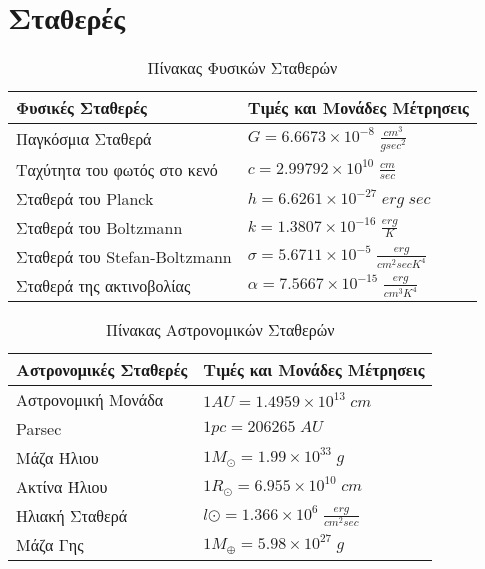 \documentclass[12pt,twoside]{report}
\numberwithin{equation}{section}
\newcommand{\en} {\selectlanguage {english}}
\begin{document}
\newpage

\tableofcontents
\listoffigures
\listoftables


\newpage
\chapter*{Σταθερές}
\begin{table}[h]
 \centering
 \begin{tabular}{l | l }
   Φυσικές Σταθερές & {Τιμές και Μονάδες Μέτρησεις}\\
     \hline \hline
   Παγκόσμια Σταθερά & $G=6.6673\times10^{-8} \; \frac{cm^3}{g sec^2} $\\
   Ταχύτητα του φωτός στο κενό & $c=2.99792\times10^{10} \; \frac{cm}{sec}$\\
   Σταθερά του {\en Planck} & $h=6.6261\times10^{-27} \; erg \; sec$\\
   Σταθερά του {\en Boltzmann} & $k=1.3807\times10^{-16} \; \frac{erg}{K}$\\
   Σταθερά του {\en Stefan-Boltzmann} & $\sigma=5.6711\times10^{-5} \; \frac{erg}{cm^2 sec K^4}$\\
   Σταθερά της ακτινοβολίας & $α=7.5667\times10^{-15} \; \frac{erg}{cm^3K^4}$\\
 \end{tabular}
 \caption{Πίνακας Φυσικών Σταθερών}\label{tab:Constants}
\end{table}

\begin{table}[h]
 \centering
 \begin{tabular}{l | l }
   Αστρονομικές Σταθερές & {Τιμές και Μονάδες Μέτρησεις}\\
     \hline \hline
   Αστρονομική Μονάδα & $1 AU = 1.4959\times10^{13} \; cm $\\
   {\en Parsec} & $1 pc = 206265 \; AU $\\
   Μάζα Ήλιου & $1 M_\odot = 1.99\times10^{33} \; g$\\
   Ακτίνα Ήλιου & $1 R_\odot = 6.955\times10^{10} \; cm$\\
   Ηλιακή Σταθερά & $l\odot = 1.366\times10^{6} \; \frac{erg}{cm^2 sec}$\\
   Μάζα Γης & $1 M_\oplus = 5.98\times10^{27} \; g$\\
 \end{tabular}
 \caption{Πίνακας Αστρονομικών Σταθερών}\label{tab:Constants2}
\end{table}

\newpage
\end{document}
